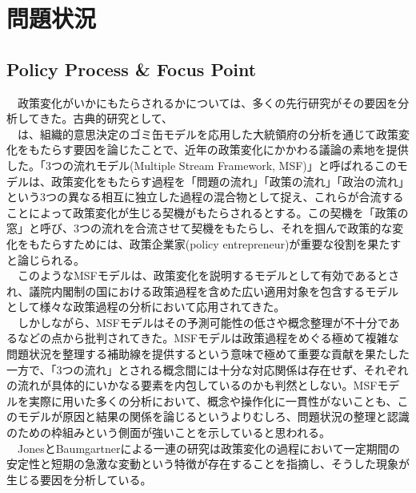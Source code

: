\documentclass{article}
\begin{document}
\section{問題状況}
\subsection{Policy Process \& Focus Point}
　政策変化がいかにもたらされるかについては、多くの先行研究がその要因を分析してきた。古典的研究として、\\
　\citet*{Kingdon1984-oq, Kingdon2013-ac}は、組織的意思決定のゴミ缶モデル\citep*{Cohen1972-ym}を応用した大統領府の分析を通じて政策変化をもたらす要因を論じたことで、近年の政策変化にかかわる議論の素地を提供した。「3つの流れモデル(Multiple Stream Framework, MSF)」と呼ばれるこのモデルは、政策変化をもたらす過程を「問題の流れ」「政策の流れ」「政治の流れ」という3つの異なる相互に独立した過程の混合物として捉え、これらが合流することによって政策変化が生じる契機がもたらされるとする。この契機を「政策の窓」と呼び、3つの流れを合流させて契機をもたらし、それを掴んで政策的な変化をもたらすためには、政策企業家(policy entrepreneur)が重要な役割を果たすと論じられる。\citep*{Kingdon1984-oq, Kingdon2013-ac}\\
　このようなMSFモデルは、政策変化を説明するモデルとして有効であるとされ、議院内閣制の国における政策過程を含めた広い適用対象を包含するモデルとして様々な政策過程の分析において応用されてきた。\citep*{Rawat2016-ew,Jones2016-lc}\\
　しかしながら、MSFモデルはその予測可能性の低さ\citep*{}や概念整理が不十分である\citep*{John2018-im}などの点から批判されてきた。MSFモデルは政策過程をめぐる極めて複雑な問題状況を整理する補助線を提供するという意味で極めて重要な貢献を果たした一方で、「3つの流れ」とされる概念間には十分な対応関係は存在せず、それぞれの流れが具体的にいかなる要素を内包しているのかも判然としない。MSFモデルを実際に用いた多くの分析において、概念や操作化に一貫性がない\citep*{Jones2016-lc}ことも、このモデルが原因と結果の関係を論じるというよりむしろ、問題状況の整理と認識のための枠組みという側面が強いことを示していると思われる。\\
　JonesとBaumgartnerによる一連の研究\citep*{Baumgartner2010-rl, Baumgartner2020-ee, Baumgartner2009-eb}は政策変化の過程において一定期間の安定性と短期の急激な変動という特徴が存在することを指摘し、そうした現象が生じる要因を分析している。\\
\end{document}
